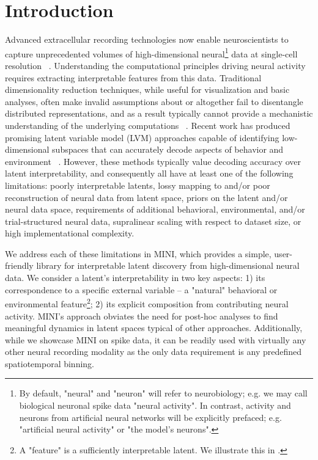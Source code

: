 \section{Introduction}

Advanced extracellular recording technologies now enable neuroscientists to capture unprecedented volumes of high-dimensional neural\footnote{By default, "neural" and "neuron" will refer to neurobiology; e.g. we may call biological neuronal spike data "neural activity". In contrast, activity and neurons from artificial neural networks will be explicitly prefaced; e.g. "artificial neural activity" or "the model's neurons".} data at single-cell resolution ~\cite{steinmetz_2021_neuropixels2, raducanu_2017_neuroseeker, cai_2016_miniscope, villette_2019_voltage_2p, ouzounov_2017_three_photon, ahrens_2013_lightsheet}. Understanding the computational principles driving neural activity requires extracting interpretable features from this data. Traditional dimensionality reduction techniques, while useful for visualization and basic analyses, often make invalid assumptions about or altogether fail to disentangle distributed representations, and as a result typically cannot provide a mechanistic understanding of the underlying computations ~\cite{cunningham_2014_neural_dr, humphries_2021_dr_principles}. Recent work has produced promising latent variable model (LVM) approaches capable of identifying low-dimensional subspaces that can accurately decode aspects of behavior and environment ~\cite{song_2025_langevinflow, schneider_2023_cebra, le_2022_stndt, keshtkaran_2022_autolfads, yu_2009_gpfa, macke_2011_plds, gao_2016_pflds, low_2018_mind, jensen_2020_mgplvm, hernandez_2020_vind, kim_2021_plnde, hurwitz_2021_tndm, schimel_2022_ilqrvae, kudryashova_2023_ctrltndm, ye_2023_ndt2, gondur_2024_mmgpvae, pellegrino_2024_slicetca, sani_2024_dpad, pals_2024_smclr_rnn, zhang_2024_mtm, george_2025_simpl, perkins_2025_mint, schmutz_2025_nce}. However, these methods typically value decoding accuracy over latent interpretability, and consequently all have at least one of the following limitations: poorly interpretable latents, lossy mapping to and/or poor reconstruction of neural data from latent space, priors on the latent and/or neural data space, requirements of additional behavioral, environmental, and/or trial-structured neural data, supralinear scaling with respect to dataset size, or high implementational complexity.

We address each of these limitations in MINI, which provides a simple, user-friendly library for interpretable latent discovery from high-dimensional neural data. We consider a latent's interpretability in two key aspects: 1) its correspondence to a specific external variable -- a "natural" behavioral or environmental feature\footnote{A "feature" is a sufficiently interpretable latent. We illustrate this in .}; 2) its explicit composition from contributing neural activity. MINI's approach obviates the need for post-hoc analyses to find meaningful dynamics in latent spaces typical of other approaches. Additionally, while we showcase MINI on spike data, it can be readily used with virtually any other neural recording modality as the only data requirement is any predefined spatiotemporal binning.

